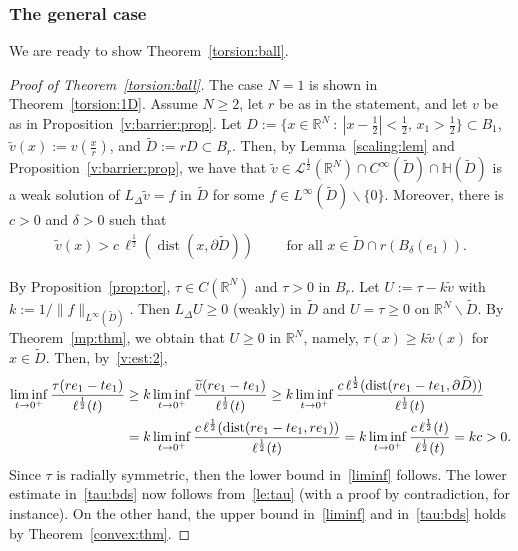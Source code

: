 \documentclass[11pt]{article}
\newcommand{\R}{\mathbb{R}}
\numberwithin{equation}{section}
\newcommand{\cL}{{\mathcal L}}
\begin{document}
\subsubsection{The general case}

We are ready to show Theorem~\ref{torsion:ball}. 
\begin{proof}[Proof of Theorem~\ref{torsion:ball}]
The case $N=1$ is shown in Theorem~\ref{torsion:1D}. Assume $N\geq 2$, let $r$ be as in the statement, and let $v$ be as in Proposition~\ref{v:barrier:prop}. Let $D:=\{x\in\R^N\::\: |x-\frac{1}{2}|<\frac{1}{2},\, x_1>\frac{1}{2}\}\subset B_1$, $\widetilde v(x):=v(\frac{x}{r})$, and $\widetilde D:=rD\subset B_r$.  Then, by Lemma~\ref{scaling:lem} and Proposition~\ref{v:barrier:prop}, we have that $\widetilde v\in \cL^{\frac{1}{2}}(\R^N)\cap C^\infty(\widetilde D)\cap {\mathbb H}(\widetilde D)$ is a weak solution of $L_\Delta \widetilde v= f$ in $\widetilde D$ for some $f\in L^\infty(\widetilde D)\backslash\{0\}.$ Moreover, there is $c>0$ and $\delta>0$ such that
\begin{align}\label{v:est:2}
\widetilde v(x)>c\,\ell^{\frac{1}{2}}(\operatorname{dist}(x,\partial \widetilde D))\qquad \text{ for all }x\in \widetilde D\cap r(B_\delta(e_1)).
\end{align}

By Proposition~\ref{prop:tor}, $\tau\in C(\R^N)$ and $\tau>0$ in $B_r$.  Let $U:=\tau-k\widetilde v$ with $k:=1/\|f\|_{L^\infty(\widetilde D)}$. Then $L_\Delta U \geq 0$ (weakly) in $\widetilde D$ and $U=\tau\geq 0$ on $\R^N\backslash \widetilde D$. By Theorem~\ref{mp:thm}, we obtain that $U\geq 0$ in $\R^N$, namely, $\tau(x)\geq k\widetilde v(x)$ for $x\in \widetilde D.$ Then, by~\eqref{v:est:2},
\begin{align}
\liminf_{t\to 0^+} \frac{\tau(re_1-t e_1)}{\ell^\frac{1}{2}(t)}
&\geq k\liminf_{t\to 0^+} \frac{\widetilde v(re_1-t e_1)}{\ell^\frac{1}{2}(t)}
\geq k\liminf_{t\to 0^+} \frac{c\,\ell^{\frac{1}{2}}(\operatorname{dist}(re_1-t e_1,\partial \widetilde D))}{\ell^\frac{1}{2}(t)}\notag\\
&=k\liminf_{t\to 0^+} \frac{c\,\ell^{\frac{1}{2}}(\operatorname{dist}(re_1-t e_1,re_1))}{\ell^\frac{1}{2}(t)}
=k\liminf_{t\to 0^+} \frac{c\,\ell^{\frac{1}{2}}(t)}{\ell^\frac{1}{2}(t)}
=kc>0.\label{le:tau}
\end{align}
Since $\tau$ is radially symmetric, then the lower bound in~\eqref{liminf} follows. The lower estimate in~\eqref{tau:bds} now follows from~\eqref{le:tau} (with a proof by contradiction, for instance). On the other hand, the upper bound in~\eqref{liminf} and in~\eqref{tau:bds} holds by Theorem~\ref{convex:thm}.
\end{proof}
\end{document}
